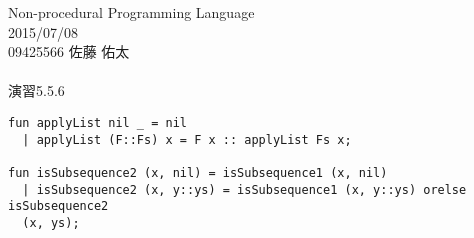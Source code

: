 
\oddsidemargin  -5mm
\evensidemargin -5mm
\textwidth      170mm
\textheight     250mm
\topmargin      -20mm



Non-procedural Programming Language
\\
2015/07/08
\\
09425566
佐藤 佑太
\\
\\
演習5.5.6
\\
\begin{verbatim}
fun applyList nil _ = nil
  | applyList (F::Fs) x = F x :: applyList Fs x;

fun isSubsequence2 (x, nil) = isSubsequence1 (x, nil)
  | isSubsequence2 (x, y::ys) = isSubsequence1 (x, y::ys) orelse isSubsequence2
  (x, ys);
\end{verbatim}



